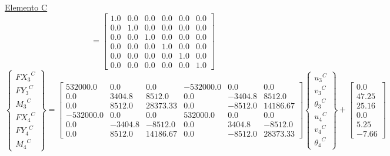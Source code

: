 \documentclass[a4paper]{article}
\begin{document}
\underline{Elemento C}
{
\renewcommand{\arraystretch}{1.7}
\begin{equation}
[T^*_C]=
\left[\begin{matrix}1.0 & 0.0 & 0.0 & 0.0 & 0.0 & 0.0\\0.0 & 1.0 & 0.0 & 0.0 & 0.0 & 0.0\\0.0 & 0.0 & 1.0 & 0.0 & 0.0 & 0.0\\0.0 & 0.0 & 0.0 & 1.0 & 0.0 & 0.0\\0.0 & 0.0 & 0.0 & 0.0 & 1.0 & 0.0\\0.0 & 0.0 & 0.0 & 0.0 & 0.0 & 1.0\end{matrix}\right]
\end{equation}
\begin{equation}
\left\{ \begin{array}{c}
{FX_3}^C \\ {FY_3}^C \\ {M_3}^C \\
{FX_4}^C  \\ {FY_4}^C \\ {M_4}^C 
\end{array} \right\} = 
\left[\begin{matrix}532000.0 & 0.0 & 0.0 & -532000.0 & 0.0 & 0.0\\0.0 & 3404.8 & 8512.0 & 0.0 & -3404.8 & 8512.0\\0.0 & 8512.0 & 28373.33 & 0.0 & -8512.0 & 14186.67\\-532000.0 & 0.0 & 0.0 & 532000.0 & 0.0 & 0.0\\0.0 & -3404.8 & -8512.0 & 0.0 & 3404.8 & -8512.0\\0.0 & 8512.0 & 14186.67 & 0.0 & -8512.0 & 28373.33\end{matrix}\right]
\left\{ \begin{array}{c}
{u_3}^C \\ {v_3}^C \\ {{\theta}_3}^C \\
{u_4}^C  \\ {v_4}^C \\ {{\theta}_4}^C 
\end{array} \right\}+
\begin{bmatrix}0.0\\47.25\\25.16\\0.0\\5.25\\-7.66\end{bmatrix}
\end{equation}
}
\end{document}
